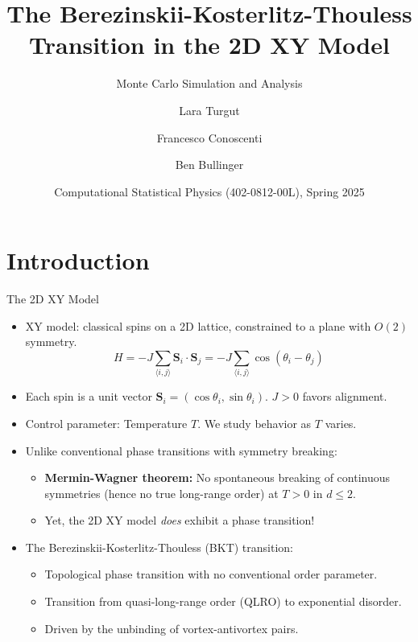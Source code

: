 \documentclass[11pt,aspectratio=169]{beamer}
\title{The Berezinskii-Kosterlitz-Thouless Transition in the 2D XY Model}
\subtitle{Monte Carlo Simulation and Analysis}
\author{Lara Turgut \and Francesco Conoscenti \and Ben Bullinger}
\institute{ETH Zürich\\ Department of Physics}
\date{Computational Statistical Physics (402-0812-00L), Spring 2025}
\begin{document}
\def\titlefigure{} %
\setlength{\titleboxwidth}{0.85\textwidth} %
\titleframe %

\tocframe %

\section{Introduction}

\begin{frame}{The 2D XY Model}
    \begin{itemize}
        \item XY model: classical spins on a 2D lattice, constrained to a plane with $O(2)$ symmetry.
        \begin{equation}
            H = -J \sum_{\langle i,j \rangle} \mathbf{S}_i \cdot \mathbf{S}_j = -J \sum_{\langle i,j \rangle} \cos(\theta_i - \theta_j)
        \end{equation}
        \cite{drouin2022kosterlitz}
        \item Each spin is a unit vector $\mathbf{S}_i = (\cos\theta_i, \sin\theta_i)$. $J>0$ favors alignment.
        \item Control parameter: Temperature $T$. We study behavior as $T$ varies.
        \pause
        \item Unlike conventional phase transitions with symmetry breaking:
            \begin{itemize}
                \item \textbf{Mermin-Wagner theorem:} No spontaneous breaking of continuous symmetries (hence no true long-range order) at $T > 0$ in $d \leq 2$.
                \item Yet, the 2D XY model \textit{does} exhibit a phase transition!
            \end{itemize}
        \pause
        \item The Berezinskii-Kosterlitz-Thouless (BKT) transition:
            \begin{itemize}
                \item Topological phase transition with no conventional order parameter.
                \item Transition from quasi-long-range order (QLRO) to exponential disorder.
                \item Driven by the unbinding of vortex-antivortex pairs.
            \end{itemize}
    \end{itemize}
\end{frame}
\end{document}
